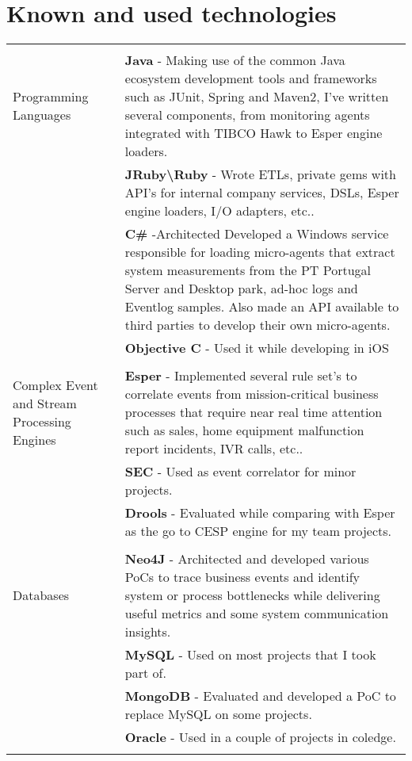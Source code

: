 \documentclass[a4paper,10pt]{article}
\begin{document}
\section{Known and used technologies}
\begin{tabular}{p{4cm}|p{9cm}}
\multicolumn{2}{c}{} \\
	Programming Languages
	& {\bf Java} - Making use of the common Java ecosystem development tools and
frameworks such as JUnit, Spring and Maven2, I’ve written several components,
from monitoring agents integrated with TIBCO Hawk to Esper engine loaders.  \\
	& {\bf JRuby\textbackslash Ruby} - Wrote ETLs, private gems with API’s for internal company services, DSLs, Esper engine loaders, I/O adapters, etc..\\
	& {\bf C\# } -Architected
Developed a Windows service responsible for loading micro-agents that extract
system measurements from the PT Portugal Server and Desktop park, ad-hoc logs
and Eventlog samples. Also made an API available to third parties to develop their own micro-agents.\\
	& {\bf Objective C} - Used it while developing in iOS\\
\multicolumn{2}{c}{} \\
	Complex Event and Stream Processing Engines
	& {\bf Esper} - Implemented several rule set’s to correlate events from mission-critical
business processes that require near real time attention such as sales, home
equipment malfunction report incidents, IVR calls, etc..\\
	& {\bf SEC} - Used as event correlator for minor projects. \\
	& {\bf Drools} - Evaluated while comparing with Esper as the go to CESP engine for my team projects. \\
\multicolumn{2}{c}{} \\
	Databases
	& {\bf Neo4J} - Architected and developed various PoCs to trace business events and
identify system or process bottlenecks while delivering useful metrics and some
system communication insights.\\ 
	& {\bf MySQL} - Used on most projects that I took part of. \\
	& {\bf MongoDB} - Evaluated and developed a PoC to replace MySQL on some projects. \\
	& {\bf Oracle} - Used in a couple of projects in coledge.\\
\multicolumn{2}{c}{} \\

\end{tabular}
\end{document}
